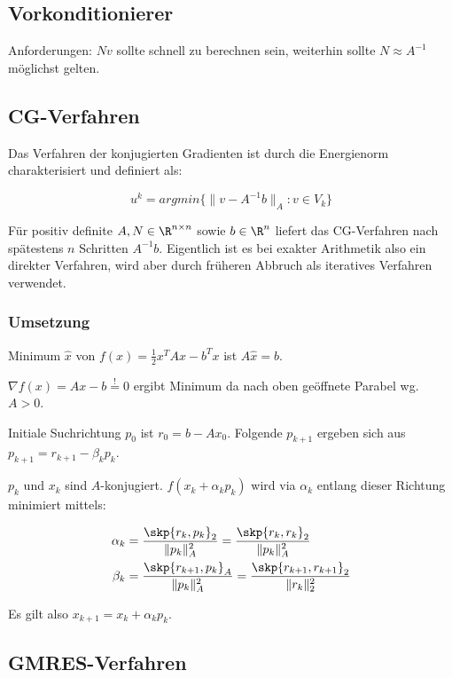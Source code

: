 \subsection*{Vorkonditionierer}

Anforderungen: $Nv$ sollte schnell zu berechnen sein, weiterhin sollte $N \approx A^{-1}$ möglichst gelten.

\subsection*{CG-Verfahren}

Das Verfahren der konjugierten Gradienten ist durch die Energienorm charakterisiert und definiert als:

\vspace{-2mm}
$$u^k = argmin\{\|v-A^{-1}b\|_A : v \in V_k\}$$

Für positiv definite $A, N \in \R^{n \times n}$ sowie $b \in \R^n$ liefert das CG-Verfahren nach spätestens $n$ Schritten $A^{-1}b$. Eigentlich ist es bei exakter Arithmetik also ein direkter Verfahren, wird aber durch früheren Abbruch als iteratives Verfahren verwendet.

\subsubsection*{Umsetzung}

Minimum $\hat x$ von $f(x)=\frac{1}{2} x^TAx - b^Tx$ ist $A\hat x = b$.

$\nabla f(x) = Ax - b \overset{!}{=} 0$ ergibt Minimum da nach oben geöffnete Parabel wg. $A > 0$.

Initiale Suchrichtung $p_0$ ist $r_0 = b - Ax_0$. Folgende $p_{k+1}$ ergeben sich aus $p_{k+1} = r_{k+1} - \beta_k p_k$.

$p_k$ und $x_k$ sind $A$-konjugiert. $f(x_k + \alpha_k p_k)$ wird via $\alpha_k$ entlang dieser Richtung minimiert mittels:

\vspace{-4mm}
\begin{align*}
\alpha_k &= \frac{\skp{r_k,p_k}_2}{\|p_k\|_A^2}     = \frac{\skp{r_k,r_k}_2}{\|p_k\|_A^2} \\
\beta_k  &= \frac{\skp{r_{k+1},p_k}_A}{\|p_k\|_A^2} = \frac{\skp{r_{k+1},r_{k+1}}_2}{\|r_k\|_2^2}
\end{align*}

Es gilt also $x_{k+1} = x_k + \alpha_k p_k$.

\subsection*{GMRES-Verfahren}

